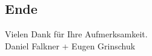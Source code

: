 \documentclass[xcolor=dvipsnames]{beamer}
\subtitle{Modul INT02} %
\institute{AKAD Pinneberg + Stuttgart} %
\title{\Title}
\author{\Author}
\date{\today}
\newcommand*{\Author}{Daniel Falkner + Eugen Grinschuk} %
\begin{document}
\begin{frame}
    \titlepage
\end{frame}


\frame{\tableofcontents} 

 

\subsection*{Ende}
\begin{frame}
	\begin{block}{}	
		\begin{center}
			Vielen Dank für Ihre Aufmerksamkeit. \\
			\Author{}
		\end{center}	
	\end{block}
\end{frame}
\end{document}
